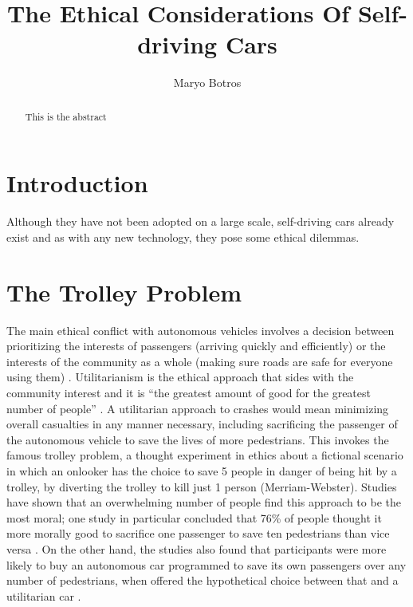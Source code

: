 \documentclass[10pt,twocolumn]{article}
\title{The Ethical Considerations Of Self-driving Cars}
\author{Maryo Botros}
\affiliation{Occidental College}
\begin{document}
\maketitle

\begin{abstract}
    This is the abstract
    
\end{abstract}

\section{Introduction}

Although they have not been adopted on a large scale, self-driving cars already exist and as with any new technology, they pose some ethical dilemmas. 

\section{The Trolley Problem}
The main ethical conflict with autonomous vehicles involves a decision between prioritizing the interests of passengers (arriving quickly and efficiently) or the interests of the community as a whole (making sure roads are safe for everyone using them)  \cite{AutonomousAccidents}. Utilitarianism is the ethical approach that sides with the community interest and it is “the greatest amount of good for the greatest number of people”  \cite{AutonomousAccidents}. A utilitarian approach to crashes would mean minimizing overall casualties in any manner necessary, including sacrificing the passenger of the autonomous vehicle to save the lives of more pedestrians. This invokes the famous trolley problem, a thought experiment in ethics about a fictional scenario in which an onlooker has the choice to save 5 people in danger of being hit by a trolley, by diverting the trolley to kill just 1 person (Merriam-Webster).  Studies have shown that an overwhelming number of people find this approach to be the most moral; one study in particular concluded that 76\% of people thought it more morally good to sacrifice one passenger to save ten pedestrians than vice versa  \cite{AutonomousAccidents}. On the other hand, the studies also found that participants were more likely to buy an autonomous car programmed to save its own passengers over any number of pedestrians, when offered the hypothetical choice between that and a utilitarian car  \cite{AutonomousAccidents}.
\end{document}
